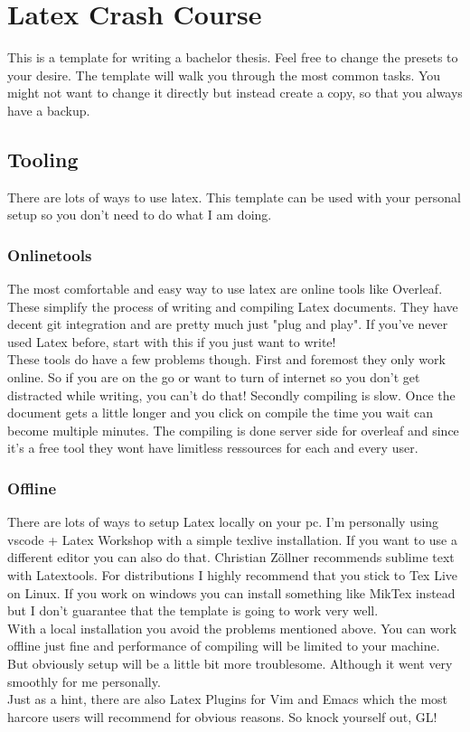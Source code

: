 \chapter{Latex Crash Course}
\label{sec:explanation}
This is a template for writing a bachelor thesis. Feel free to change the presets to your desire.
The template will walk you through the most common tasks. You might not want to change it directly but instead create a copy, so that you always have a backup.

\section{Tooling}
There are lots of ways to use latex. This template can be used with your personal setup so you don't need to do what I am doing.

\subsection{Onlinetools}
The most comfortable and easy way to use latex are online tools like Overleaf. These simplify the process of writing and compiling Latex documents. They have decent git integration and are pretty much just "plug and play". If you've never used Latex before, start with this if you just want to write! \\
These tools do have a few problems though. First and foremost they only work online. So if you are on the go or want to turn of internet so you don't get distracted while writing, you can't do that! Secondly compiling is slow. Once the document gets a little longer and you click on compile the time you wait can become multiple minutes. The compiling is done server side for overleaf and since it's a free tool they wont have limitless ressources for each and every user.

\subsection{Offline}
There are lots of ways to setup Latex locally on your pc. I'm personally using vscode + Latex Workshop with a simple texlive installation.
If you want to use a different editor you can also do that. Christian Zöllner recommends sublime text with Latextools. For distributions I highly recommend that you stick to Tex Live on Linux. If you work on windows you can install something like MikTex instead but I don't guarantee that the template is going to work very well.\\
With a local installation you avoid the problems mentioned above. You can work offline just fine and performance of compiling will be limited to your machine. But obviously setup will be a little bit more troublesome. Although it went very smoothly for me personally.\\
Just as a hint, there are also Latex Plugins for Vim and Emacs which the most harcore users will recommend for obvious reasons. So knock yourself out, GL!

